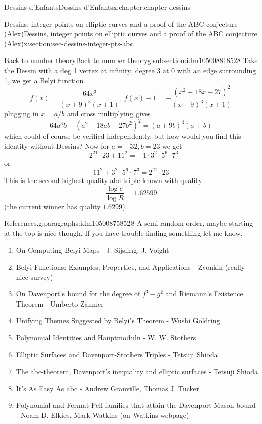 \documentclass[oneside,10pt,]{book}
\numberwithin{equation}{section}
\begin{document}
\begin{chapterptx}{Dessins d'Enfants}{}{Dessins d'Enfants}{}{}{x:chapter:chapter-dessins}
\begin{sectionptx}{Dessins, integer points on elliptic curves and a proof of the ABC conjecture (Alex)}{}{Dessins, integer points on elliptic curves and a proof of the ABC conjecture (Alex)}{}{}{x:section:sec-dessins-integer-pts-abc}
\begin{subsectionptx}{Back to number theory}{}{Back to number theory}{}{}{g:subsection:idm105008818528}
Take the Dessin with a deg 1 vertex at infinity, degree 3 at 0 with an edge surrounding 1, we get a Belyi function%
\begin{equation*}
f(x) = \frac{64x^3}{(x+9)^3 (x+1)},\,f(x) - 1 = -\frac{(x^2 - 18x -27)^2}{(x+9)^3(x+1)}
\end{equation*}
plugging in \(x=a/b\) and cross multiplying gives%
\begin{equation*}
64a^3 b + (a^2 - 18ab - 27b^2)^2 = (a+9b)^3(a+b)
\end{equation*}
which could of course be verified independently, but how would you find this identity without Dessins? Now for \(a = -32, b= 23\) we get%
\begin{equation*}
- 2^{21} \cdot 23 +  11^2 =  -1 \cdot 3^2 \cdot 5^6 \cdot 7^3
\end{equation*}
or%
\begin{equation*}
11^2 + 3^2 \cdot 5^6 \cdot 7^3 = 2^{21} \cdot 23
\end{equation*}
This is the second highest quality abc triple known with quality%
\begin{equation*}
\frac{\log c}{\log R} = 1.62599
\end{equation*}
(the current winner has quality \(1.6299\)).%
\begin{paragraphs}{References.}{g:paragraphs:idm105008758528}%
A semi-random order, maybe starting at the top is nice though. If you have trouble finding something let me know.%
\begin{enumerate}
\item{}On Computing Belyi Maps - J. Sijsling, J. Voight%
\item{}Belyi Functions: Examples, Properties, and Applications - Zvonkin (really nice survey)%
\item{}On Davenport’s bound for the degree of \(f^3 - g^2\) and Riemann's Existence Theorem - Umberto Zannier%
\item{}Unifying Themes Suggested by Belyi's Theorem - Wushi Goldring%
\item{}Polynomial Identities and Hauptmoduln - W. W. Stothers%
\item{}Elliptic Surfaces and Davenport-Stothers Triples -  Tetsuji Shioda%
\item{}The abc-theorem, Davenport’s inequality and elliptic surfaces - Tetsuji Shioda%
\item{}It's As Easy As abc -  Andrew Granville, Thomas J. Tucker%
\item{}Polynomial and Fermat-Pell families that attain the Davenport-Mason bound - Noam D. Elkies, Mark Watkins (on Watkins webpage)%

\end{enumerate}
\end{paragraphs}
\end{subsectionptx}
\end{sectionptx}
\end{chapterptx}
\end{document}
